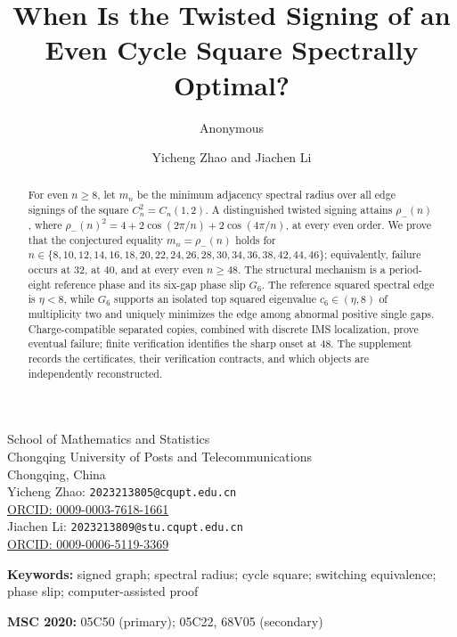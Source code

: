 \title{When Is the Twisted Signing of an Even Cycle Square Spectrally Optimal?}
\ifdefined\TargetAAnonymous
  \author{Anonymous}
\else
  \author{Yicheng Zhao and Jiachen Li}
\fi
\date{}
\maketitle

\ifdefined\TargetAAnonymous\else
\begin{center}
\small
School of Mathematics and Statistics\\
Chongqing University of Posts and Telecommunications\\
Chongqing, China\\[3pt]
Yicheng Zhao: \texttt{2023213805@cqupt.edu.cn}\\
\href{https://orcid.org/0009-0003-7618-1661}
  {ORCID: 0009-0003-7618-1661}\\
Jiachen Li: \texttt{2023213809@stu.cqupt.edu.cn}\\
\href{https://orcid.org/0009-0006-5119-3369}
  {ORCID: 0009-0006-5119-3369}
\end{center}
\fi

\begin{abstract}
For even \(n\geq8\), let \(m_n\) be the minimum adjacency spectral radius
over all edge signings of the square \(C_n^2=C_n(1,2)\). A distinguished
twisted signing attains \(\rho_-(n)\), where
\(\rho_-(n)^2=4+2\cos(2\pi/n)+2\cos(4\pi/n)\), at every even order.  We prove
that the conjectured equality \(m_n=\rho_-(n)\) holds for
\(n\in\{8,10,12,14,16,18,20,22,24,26,28,30,34,36,38,42,44,46\}\); equivalently,
failure occurs at \(32\), at \(40\), and at every even \(n\geq48\).
The structural mechanism is a period-eight reference phase and its six-gap
phase slip \(G_6\). The reference squared spectral edge is \(\eta<8\), while
\(G_6\) supports an isolated top squared eigenvalue \(c_6\in(\eta,8)\) of
multiplicity two and uniquely minimizes the edge among abnormal positive
single gaps. Charge-compatible separated copies, combined with discrete IMS
localization, prove eventual failure; finite verification identifies
the sharp onset at \(48\). The supplement records the certificates, their
verification contracts, and which objects are independently reconstructed.
\end{abstract}

\noindent\textbf{Keywords:} signed graph; spectral radius; cycle square;
switching equivalence; phase slip; computer-assisted proof

\medskip
\noindent\textbf{MSC 2020:} 05C50 (primary); 05C22, 68V05 (secondary)
